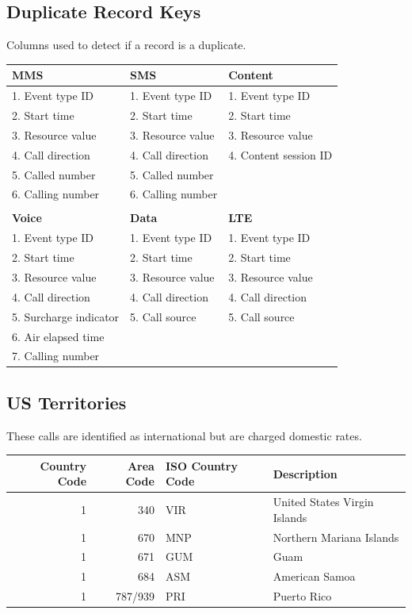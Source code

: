 \documentclass[12pt,twoside]{article}
\begin{document}
\subsection{Duplicate Record Keys}
\label{sec:orgheadline6}
Columns used to detect if a record is a duplicate.
\small
\begin{center}
\begin{tabular}{lll}
\hline
\textbf{MMS} & \textbf{SMS} & \textbf{Content}\\
\hline
1. Event type ID & 1. Event type ID & 1. Event type ID\\
2. Start time & 2. Start time & 2. Start time\\
3. Resource value & 3. Resource value & 3. Resource value\\
4. Call direction & 4. Call direction & 4. Content session ID\\
5. Called number & 5. Called number & \\
6. Calling number & 6. Calling number & \\
 &  & \\
\hline
\textbf{Voice} & \textbf{Data} & \textbf{LTE}\\
\hline
1. Event type ID & 1. Event type ID & 1. Event type ID\\
2. Start time & 2. Start time & 2. Start time\\
3. Resource value & 3. Resource value & 3. Resource value\\
4. Call direction & 4. Call direction & 4. Call direction\\
5. Surcharge indicator & 5. Call source & 5. Call source\\
6. Air elapsed time &  & \\
7. Calling number &  & \\
\hline
\end{tabular}
\end{center}

\normalsize


\subsection{US Territories}
\label{sec:orgheadline7}
These calls are identified as international but are charged
domestic rates.
\begin{center}
\begin{tabular}{rrll}
\hline
Country Code & Area Code & ISO Country Code & Description\\
\hline
1 & 340 & VIR & United States Virgin Islands\\
1 & 670 & MNP & Northern Mariana Islands\\
1 & 671 & GUM & Guam\\
1 & 684 & ASM & American Samoa\\
1 & 787/939 & PRI & Puerto Rico\\
\hline
\end{tabular}
\end{center}
\end{document}
